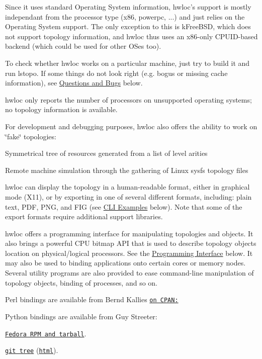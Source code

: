 Since it uses standard Operating System information, hwloc's support is mostly independant from the processor type (x86, powerpc, ...) and just relies on the Operating System support. The only exception to this is kFreeBSD, which does not support topology information, and hwloc thus uses an x86-\/only CPUID-\/based backend (which could be used for other OSes too).

To check whether hwloc works on a particular machine, just try to build it and run {\ttfamily lstopo}. If some things do not look right (e.g. bogus or missing cache information), see \hyperlink{index_bugs}{Questions and Bugs} below.

hwloc only reports the number of processors on unsupported operating systems; no topology information is available.

For development and debugging purposes, hwloc also offers the ability to work on \char`\"{}fake\char`\"{} topologies:


\begin{DoxyItemize}
\item Symmetrical tree of resources generated from a list of level arities 
\item Remote machine simulation through the gathering of Linux sysfs topology files 
\end{DoxyItemize}

hwloc can display the topology in a human-\/readable format, either in graphical mode (X11), or by exporting in one of several different formats, including: plain text, PDF, PNG, and FIG (see \hyperlink{index_cli_examples}{CLI Examples} below). Note that some of the export formats require additional support libraries.

hwloc offers a programming interface for manipulating topologies and objects. It also brings a powerful CPU bitmap API that is used to describe topology objects location on physical/logical processors. See the \hyperlink{index_interface}{Programming Interface} below. It may also be used to binding applications onto certain cores or memory nodes. Several utility programs are also provided to ease command-\/line manipulation of topology objects, binding of processes, and so on.

Perl bindings are available from Bernd Kallies \href{http://search.cpan.org/~bka/Sys-Hwloc-0.10/}{\tt on CPAN:}

Python bindings are available from Guy Streeter: 
\begin{DoxyItemize}
\item \href{http://people.redhat.com/streeter/}{\tt Fedora RPM and tarball}. 
\item \href{git://git.fedorahosted.org/python-hwloc.git}{\tt git tree} (\href{http://git.fedorahosted.org/git/python-hwloc.git}{\tt html}). 
\end{DoxyItemize}

